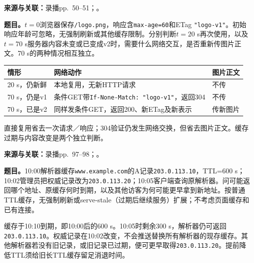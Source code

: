 
\textbf{来源与关联：}录播pp.~50--51；。

\textbf{题目。}$t=0$浏览器保存\texttt{/logo.png}，响应含\texttt{max-age=60}和ETag \texttt{"logo-v1"}。初始响应年龄可忽略，无强制刷新或其他缓存限制。分别判断$t=20$ s再次使用，以及$t=70$ s服务器内容未变或已变成v2时，需要什么网络交互，是否重新传图片正文。70 s的两种情况相互独立。

\begin{workedsolution}
\begin{center}
\small
\begin{tabularx}{\textwidth}{@{}p{2.8cm}Xp{2.1cm}@{}}
\toprule
情形 & 网络动作 & 图片正文 \\
\midrule
20 s，仍新鲜 & 本地复用，无新HTTP请求 & 不传 \\
70 s，仍是v1 & 条件GET带\texttt{If-None-Match: "logo-v1"}，返回304 & 不传 \\
70 s，已是v2 & 同样发条件GET，返回200、新ETag及新表示 & 传新图片 \\
\bottomrule
\end{tabularx}
\end{center}
直接复用省去一次请求／响应；304验证仍发生网络交换，但省去图片正文。缓存过期与内容改变是两个独立判断。
\end{workedsolution}


\textbf{来源与关联：}录播pp.~97--98；。

\textbf{题目。}10:00解析器缓存\texttt{www.example.com}的A记录\texttt{203.0.113.10}，TTL=600 s；10:02管理员把权威记录改为\texttt{203.0.113.20}；10:05客户端查询原解析器。问可能返回哪个地址、原缓存何时到期，以及其他访客为何可能更早拿到新地址。按普通TTL缓存，无强制刷新或serve-stale（过期后继续服务）扩展；不考虑页面缓存和已有连接。

\begin{workedsolution}
缓存于10:10到期，即10:00后的600 s。10:05时剩余300 s，解析器仍可返回\texttt{203.0.113.10}。权威记录在10:02改变，不会推送替换所有解析器的现存缓存。其他解析器若没有旧记录，或旧记录已过期，便可更早取得\texttt{203.0.113.20}。提前降低TTL须给旧长TTL缓存留足消退时间。
\end{workedsolution}


